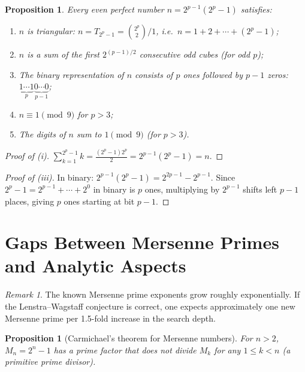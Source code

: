 \documentclass[12pt,a4paper]{amsart}
\newtheorem{proposition}[theorem]{Proposition}
\theoremstyle{definition}
\theoremstyle{remark}
\newtheorem{remark}[theorem]{Remark}
\begin{document}
\begin{proposition}
Every even perfect number $n = 2^{p-1}(2^p-1)$ satisfies:
\begin{enumerate}[label=(\roman*)]
  \item $n$ is triangular: $n = T_{2^p - 1} = \binom{2^p}{2}/1$, i.e.\
        $n = 1 + 2 + \cdots + (2^p - 1)$;
  \item $n$ is a sum of the first $2^{(p-1)/2}$ consecutive odd cubes
        (for odd $p$);
  \item The binary representation of $n$ consists of $p$ ones followed by
        $p-1$ zeros: $\underbrace{1\cdots1}_{p}\underbrace{0\cdots0}_{p-1}$;
  \item $n \equiv 1 \pmod{9}$ for $p > 3$;
  \item The digits of $n$ sum to $1 \pmod{9}$ (for $p > 3$).
\end{enumerate}
\end{proposition}

\begin{proof}[Proof of (i)]
$\sum_{k=1}^{2^p - 1} k = \frac{(2^p-1)2^p}{2} = 2^{p-1}(2^p - 1) = n$.
\end{proof}

\begin{proof}[Proof of (iii)]
In binary: $2^{p-1}(2^p - 1) = 2^{2p-1} - 2^{p-1}$. Since $2^p - 1 = 2^{p-1} + \cdots + 2^0$
in binary is $p$ ones, multiplying by $2^{p-1}$ shifts left $p-1$ places, giving
$p$ ones starting at bit $p-1$.
\end{proof}

\section{Gaps Between Mersenne Primes and Analytic Aspects}

\begin{remark}
The known Mersenne prime exponents grow roughly exponentially.
If the Lenstra--Wagstaff conjecture is correct, one expects approximately one
new Mersenne prime per 1.5-fold increase in the search depth.
\end{remark}

\begin{proposition}[Carmichael's theorem for Mersenne numbers]
For $n > 2$, $M_n = 2^n - 1$ has a prime factor that does not divide
$M_k$ for any $1 \leq k < n$ (a \emph{primitive prime divisor}).
\end{proposition}
\end{document}
